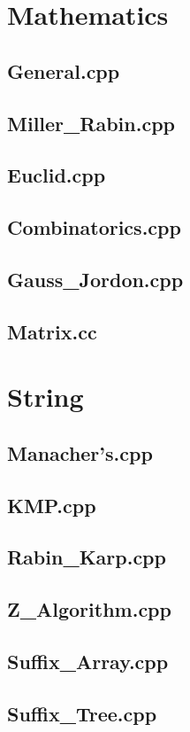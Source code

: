 \section{Mathematics}
\subsection{General.cpp}

\subsection{Miller\_Rabin.cpp}

\subsection{Euclid.cpp}

\subsection{Combinatorics.cpp}

\subsection{Gauss\_Jordon.cpp}

\subsection{Matrix.cc}

\section{String}
\subsection{Manacher's.cpp}

\subsection{KMP.cpp}

\subsection{Rabin\_Karp.cpp}

\subsection{Z\_Algorithm.cpp}

\subsection{Suffix\_Array.cpp}

\subsection{Suffix\_Tree.cpp}

